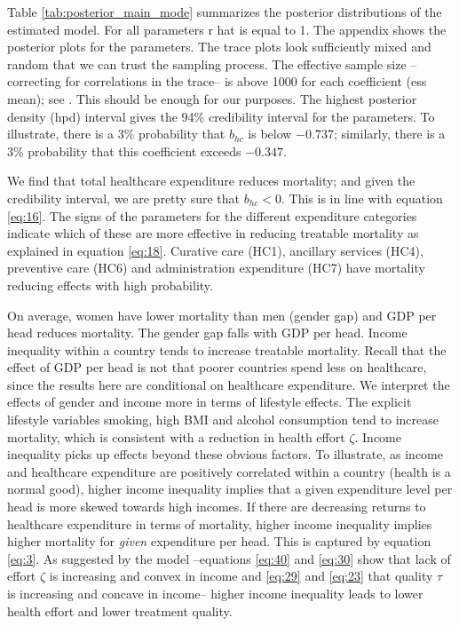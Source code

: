 \documentclass[a4paper,12pt]{article}
\begin{document}
Table \ref{tab:posterior_main_mode} summarizes the posterior distributions of the estimated model. For all parameters r hat is equal to 1. The appendix shows the posterior plots for the parameters. The trace plots look sufficiently mixed and random that we can trust the sampling process. The effective sample size --correcting for correlations in the trace-- is above 1000 for each coefficient (ess mean); see \cite{GelmanBook}. This should be enough for our purposes. The highest posterior density (hpd) interval gives the 94\% credibility interval for the parameters. To illustrate, there is a 3\% probability that \(b_{hc}\) is below \(-0.737\); similarly, there is a 3\% probability that this coefficient exceeds \(-0.347\).

We find that total healthcare expenditure reduces mortality; and given the credibility interval, we are pretty sure that \(b_{hc} < 0\). This is in line with equation \eqref{eq:16}. The signs of the parameters for the different expenditure categories indicate which of these are more effective in reducing treatable mortality as explained in equation \eqref{eq:18}. Curative care (HC1), ancillary services (HC4), preventive care (HC6) and administration expenditure (HC7) have mortality reducing effects with high probability.

On average, women have lower mortality than men (gender gap) and GDP per head reduces mortality. The gender gap falls with GDP per head. Income inequality within a country tends to increase treatable mortality. Recall that the effect of GDP per head is not that poorer countries spend less on healthcare, since the results here are conditional on healthcare expenditure. We interpret the effects of gender and income more in terms of lifestyle effects. The explicit lifestyle variables smoking, high BMI and alcohol consumption tend to increase mortality, which is consistent with a reduction in health effort \(\zeta\). Income inequality picks up effects beyond these obvious factors. To illustrate, as income and healthcare expenditure are positively correlated within a country (health is a normal good), higher income inequality implies that a given expenditure level per head is more skewed towards high incomes. If there are decreasing returns to healthcare expenditure in terms of mortality, higher income inequality implies higher mortality for \emph{given} expenditure per head. This is captured by equation \eqref{eq:3}. As suggested by the model  --equations \eqref{eq:40} and \eqref{eq:30} show that lack of effort \(\zeta\) is increasing and convex in income and \eqref{eq:29}  and \eqref{eq:23} that quality \(\tau\) is increasing and concave in income-- higher income inequality leads to lower health effort and lower treatment quality.
\end{document}
